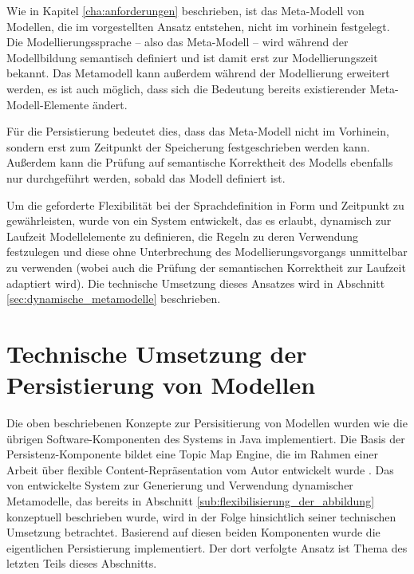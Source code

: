 Wie in Kapitel \ref{cha:anforderungen} beschrieben, ist das Meta-Modell von Modellen, die im vorgestellten Ansatz entstehen, nicht im vorhinein festgelegt. Die Modellierungssprache -- also das Meta-Modell -- wird während der Modellbildung semantisch definiert und ist damit erst zur Modellierungszeit bekannt. Das Metamodell kann außerdem während der Modellierung erweitert werden, es ist auch möglich, dass sich die Bedeutung bereits existierender Meta-Modell-Elemente ändert.

Für die Persistierung bedeutet dies, dass das Meta-Modell nicht im Vorhinein, sondern erst zum Zeitpunkt der Speicherung festgeschrieben werden kann. Außerdem kann die Prüfung auf semantische Korrektheit des Modells ebenfalls nur durchgeführt werden, sobald das Modell definiert ist. 

Um die geforderte Flexibilität bei der Sprachdefinition in Form und Zeitpunkt zu gewährleisten, wurde von \citet{Neubauer08} ein System entwickelt, das es erlaubt, dynamisch zur Laufzeit Modellelemente zu definieren, die Regeln zu deren Verwendung festzulegen und diese ohne Unterbrechung des Modellierungsvorgangs unmittelbar zu verwenden (wobei auch die Prüfung der semantischen Korrektheit zur Laufzeit adaptiert wird). Die technische Umsetzung dieses Ansatzes wird in Abschnitt \ref{sec:dynamische_metamodelle} beschrieben.



\section{Technische Umsetzung der Persistierung von Modellen} %
\label{sec:technische_umsetzung_der_persistierung_von_modellen}

Die oben beschriebenen Konzepte zur Persisitierung von Modellen wurden wie die übrigen Software-Komponenten des Systems in Java implementiert. Die Basis der Persistenz-Komponente bildet eine Topic Map Engine, die im Rahmen einer Arbeit über flexible Content-Repräsentation vom Autor entwickelt wurde \citep{Oppl07}. Das von \citet{Neubauer08} entwickelte System zur Generierung und Verwendung dynamischer Metamodelle, das bereits in Abschnitt \ref{sub:flexibilisierung_der_abbildung} konzeptuell beschrieben wurde, wird in der Folge hinsichtlich seiner technischen Umsetzung betrachtet. Basierend auf diesen beiden Komponenten wurde die eigentlichen Persistierung implementiert. Der dort verfolgte Ansatz ist Thema des letzten Teils dieses Abschnitts.

